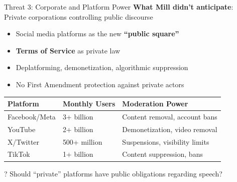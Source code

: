 ﻿\documentclass[aspectratio=169]{beamer}
\begin{document}
\begin{frame}{Threat 3: Corporate and Platform Power}
\textbf{What Mill didn't anticipate}: Private corporations controlling public discourse

\begin{itemize}
    \item Social media platforms as the new \textbf{``public square''}
    \item \textbf{Terms of Service} as private law
    \item Deplatforming, demonetization, algorithmic suppression
    \item No First Amendment protection against private actors
\end{itemize}

\vspace{0.3cm}
\begin{table}[h]
\centering
\small
\begin{tabular}{l l l}
\toprule
\textbf{Platform} & \textbf{Monthly Users} & \textbf{Moderation Power} \\
\midrule
Facebook/Meta & 3+ billion & Content removal, account bans \\
YouTube & 2+ billion & Demonetization, video removal \\
X/Twitter & 500+ million & Suspensions, visibility limits \\
TikTok & 1+ billion & Content suppression, bans \\
\bottomrule
\end{tabular}
\end{table}

\begin{alertblock}{?}
Should ``private'' platforms have public obligations regarding speech?
\end{alertblock}
\end{frame}
\end{document}
